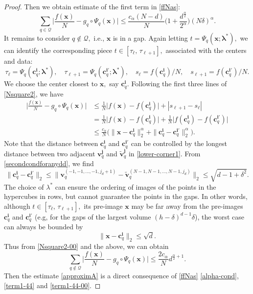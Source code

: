 \documentclass[10pt,a4paper]{amsart}
\newcommand{\bs}[1]{\boldsymbol{#1}}
\begin{document}
\begin{proof}
Then we obtain estimate of the first term in \eqref{ffNas}:
\begin{equation}\label{term1-44}
    \sum_{q\in {\mathcal Q}}\Big|\frac{f(\bs x)}{N}-g_q\circ\Psi_q(\bs x)\Big| \le \frac{c_{\alpha}(N-d)}{N}  \Big(1+\frac{d^{\frac{\alpha}{2}}} {2^{\alpha}}\Big)(N\delta)^{\alpha}.
\end{equation}
It remains to consider  $q\notin {\mathcal Q},$ i.e.,
$\bs x$ is in a gap. Again letting  
$t=\Psi_q(\bs{x};\bs \lambda^*),$ 
we can identify the corresponding piece $t\in [\tau_\ell,\,  \tau_{\ell+1}],$ associated with the centers and data:
$$
\tau_\ell= \Psi_q(\bs{c}_q^{\bs i};\bs \lambda^*),\quad  \tau_{\ell+1}= \Psi_q(\bs{c}_q^{\bs i'};\bs \lambda^*), \quad  s_\ell= f(\bs{c}_q^{\bs i})/N,\quad  s_{\ell+1}= f(\bs{c}_q^{\bs i'})/N.
$$
We choose the center closest to $\bs x,$ say $\bs{c}_q^{\bs i}.$ Following the first three lines of \eqref{Nsquare2}, we have 
\begin{equation}\label{Nsquare2-00}
\begin{split}
\Big|\frac{f(\bs{x})}{N}  -g_q\circ\Psi_q(\bs{x})\Big| & 
\le \frac 1 N \big|{f(\bs{x})}-   {f(\bs{c}_q^{\bs{i}})} \big|+|s_{\ell+1}-s_\ell|\\[4pt] 
& =\frac 1 N \big|{f(\bs{x})}-   {f(\bs{c}_q^{\bs{i}})} \big|+\frac 1 N \big|f(\bs{c}_q^{\bs i})-   f(\bs{c}_q^{\bs{i'}}) \big|\\[4pt]
&\le \frac{c_{\alpha}} N \big(\|\bs x- 
\bs{c}_q^{\bs{i}}\|_2^\alpha +
\|\bs{c}_q^{\bs{i}}-\bs{c}_q^{\bs{i'}}\|_2^\alpha\big).
\end{split}
\end{equation}
Note that the distance between $\bs{c}_q^{\bs{i}}$ and $\bs{c}_q^{\bs{i'}}$ can be controlled by the longest distance between two adjacent $\bs v_q^{\bs j}$ and 
$\tilde {\bs v}_q^{\bs j}$ in 
\eqref{lower-corner1}. From \eqref{secondcondforanydd}, we find  
\begin{equation}\label{cqi-est}
\|\bs{c}_q^{\bs{i}}-\bs{c}_q^{\bs{i'}}\|_2
\le \| \bs v_q^{(-1,-1,\ldots,-1,j_d+1)}-\tilde {\bs v}_q^{(N-1,N-1,\ldots,N-1,j_d)} \|_2
\le \sqrt{d-1+\delta^2}.
\end{equation}
The choice of $\lambda^*$ can ensure the ordering of images of the points in the hypercubes in rows, but cannot guarantee the points in the gaps. In other words, although $t\in [\tau_\ell,\,  \tau_{\ell+1}],$  its pre-image $\bs x$ may be far away from the pre-images $\bs{c}_q^{\bs{i}}$ and $\bs{c}_q^{\bs{i'}}$ (e.g, for the gaps of the largest volume  $(h-\delta)^{d-1}\delta$), the worst case can always be bounded by 
\begin{equation}\label{cqi-est2}
\|\bs x- 
\bs{c}_q^{\bs{i}}\|_2\le \sqrt d.
\end{equation}
Thus from  \eqref{Nsquare2-00} and the above,  we can obtain  
\begin{equation}\label{term1-44-00}
    \sum_{q\not \in {\mathcal Q}}\Big|\frac{f(\bs x)}{N}-g_q\circ\Psi_q(\bs x)\Big| \le  \frac{2c_{\alpha}}{N} d^{\frac \alpha 2+1}.  
\end{equation}
Then the estimate \eqref{approximA} is a direct consequence of  \eqref{ffNas}
\eqref{alpha-cond}, \eqref{term1-44} and \eqref{term1-44-00}. 
\end{proof}
\end{document}
